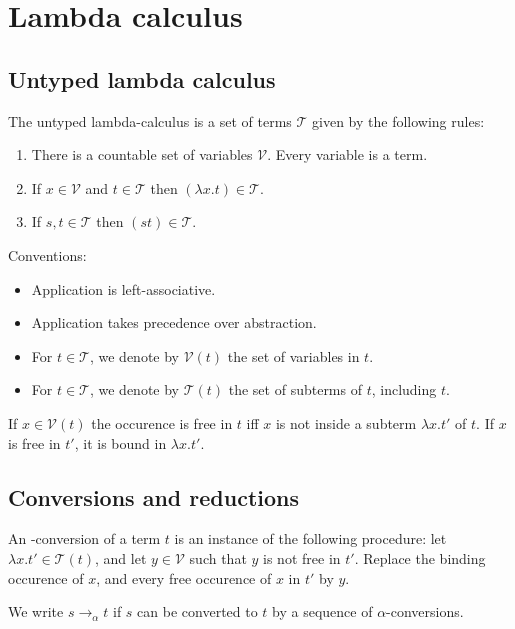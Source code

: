 \documentclass{article}
\begin{document}
\section{Lambda calculus}

\subsection{Untyped lambda calculus}

\begin{definition}
	\label{untyped lcalc}
	The untyped lambda-calculus is a set of terms $\mathcal{T}$ given by the following rules:
	\begin{enumerate}[label=L\arabic*.]
		\item There is a countable set of variables $\mathcal{V}$. Every variable is a term.
		\item If $x\in\mathcal{V}$ and $t\in\mathcal{T}$ then $(\lambda x.t)\in\mathcal{T}$.
		\item \label{l3a} If $s,t\in\mathcal{T}$ then $(st)\in\mathcal{T}$.
	\end{enumerate}
	Conventions:
	\begin{itemize}
		\item Application is left-associative.
		\item Application takes precedence over abstraction.
		\item For $t\in\mathcal{T}$, we denote by $\mathcal{V}(t)$ the set of variables in $t$.
		\item For $t\in\mathcal{T}$, we denote by $\mathcal{T}(t)$ the set of subterms of $t$, including $t$.
	\end{itemize}
\end{definition}

\begin{definition*}
	If $x\in\mathcal{V}(t)$ the occurence is free in $t$ iff $x$ is not inside a subterm
	$\lambda x.t'$ of $t$. If $x$ is free in $t'$, it is bound in $\lambda x.t'$.
\end{definition*}

\subsection{Conversions and reductions}

\begin{definition*}
	An \alpha-conversion of a term $t$ is an instance of the following procedure: let
	$\lambda x.t'\in \mathcal{T}(t)$, and let $y\in\mathcal{V}$ such that $y$ is not free
	in $t'$. Replace the binding occurence of $x$, and every free occurence of $x$ in $t'$
	by $y$.

	We write $s\to_\alpha t$ if $s$ can be converted to $t$ by a sequence of $\alpha$-conversions.
\end{definition*}
\end{document}
